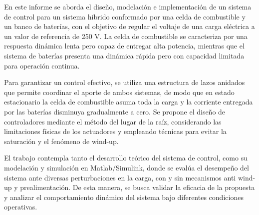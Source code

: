 En este informe se aborda el diseño, modelación e implementación de un sistema de control para un sistema híbrido conformado por una celda de combustible y un banco de baterías, con el objetivo de regular el voltaje de una carga eléctrica a un valor de referencia de 250 V. La celda de combustible se caracteriza por una respuesta dinámica lenta pero capaz de entregar alta potencia, mientras que el sistema de baterías presenta una dinámica rápida pero con capacidad limitada para operación continua.

Para garantizar un control efectivo, se utiliza una estructura de lazos anidados que permite coordinar el aporte de ambos sistemas, de modo que en estado estacionario la celda de combustible asuma toda la carga y la corriente entregada por las baterías disminuya gradualmente a cero. Se propone el diseño de controladores mediante el método del lugar de la raíz, considerando las limitaciones físicas de los actuadores y empleando técnicas para evitar la saturación y el fenómeno de wind-up.

El trabajo contempla tanto el desarrollo teórico del sistema de control, como su modelación y simulación en Matlab/Simulink, donde se evalúa el desempeño del sistema ante diversas perturbaciones en la carga, con y sin mecanismos anti wind-up y prealimentación. De esta manera, se busca validar la eficacia de la propuesta y analizar el comportamiento dinámico del sistema bajo diferentes condiciones operativas.